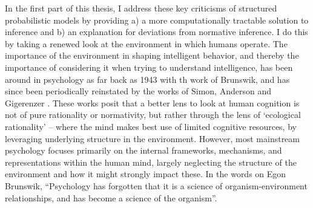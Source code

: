 
In the first part of this thesis, I address these key criticisms of structured probabilistic models by providing a) a more computationally tractable solution to inference and b) an explanation for deviations from normative inference. I do this by taking a renewed look at the environment in which humans operate. The importance of the environment in shaping intelligent behavior, and thereby the importance of considering it when trying to understand intelligence, has been around in psychology as far back as 1943 with th work of Brunswik\cite{brunswik1943organismic}, and has since been periodically reinstated by the works of Simon\cite{simon1956rational}, Anderson\cite{anderson1990adaptive} and Gigerenzer \cite{gigerenzer1999simple}. These works posit that a better lens to look at human cognition is not of pure rationality or normativity, but rather through the lens of `ecological rationality' -- where the mind makes best use of limited cognitive resources, by leveraging underlying structure in the environment. However, most mainstream psychology focuses primarily on the internal frameworks, mechanisms, and representations within the human mind, largely neglecting the structure of the environment and how it might strongly impact these. In the words on Egon Brunswik, ``Psychology has forgotten that it is a science of organism-environment relationships, and has become a science of the organism''.  

